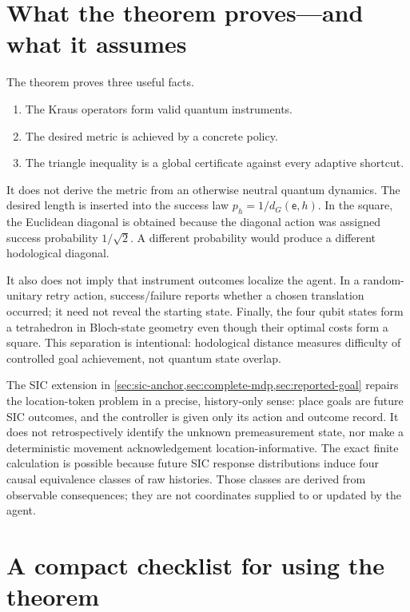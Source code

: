 \documentclass[11pt]{article}
\theoremstyle{definition}
\theoremstyle{remark}
\newcommand{\id}{\mathsf e}
\begin{document}
\section{What the theorem proves---and what it assumes}

The theorem proves three useful facts.
\begin{enumerate}
\item The Kraus operators form valid quantum instruments.
\item The desired metric is achieved by a concrete policy.
\item The triangle inequality is a global certificate against every adaptive
shortcut.
\end{enumerate}

It does not derive the metric from an otherwise neutral quantum dynamics.  The
desired length is inserted into the success law \(p_h=1/d_G(\id,h)\). In the
square, the Euclidean diagonal is obtained because the diagonal action was
assigned success probability \(1/\sqrt2\). A different probability would
produce a different hodological diagonal.

It also does not imply that instrument outcomes localize the agent.  In a
random-unitary retry action, success/failure reports whether a chosen
translation occurred; it need not reveal the starting state.  Finally, the
four qubit states form a tetrahedron in Bloch-state geometry even though their
optimal costs form a square.  This separation is intentional: hodological
distance measures difficulty of controlled goal achievement, not quantum
state overlap.

The SIC extension in \cref{sec:sic-anchor,sec:complete-mdp,sec:reported-goal}
repairs the location-token problem in a precise, history-only sense: place
goals are future SIC outcomes, and the controller is given only its action and
outcome record. It does not retrospectively identify the unknown
premeasurement state, nor make a deterministic movement acknowledgement
location-informative.  The exact finite calculation is possible because
future SIC response distributions induce four causal equivalence classes of
raw histories.  Those classes are derived from observable consequences; they
are not coordinates supplied to or updated by the agent.

\section{A compact checklist for using the theorem}
\end{document}
